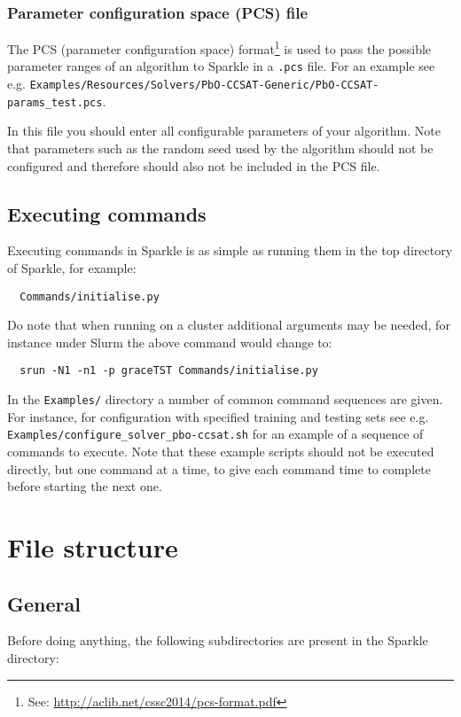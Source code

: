 \documentclass{article}
\begin{document}
\subsubsection{Parameter configuration space (PCS) file}
\label{quick:pcs_file}

The PCS (parameter configuration space) format\footnote{See: \url{http://aclib.net/cssc2014/pcs-format.pdf}} is used to pass the possible parameter ranges of an algorithm to Sparkle in a \texttt{.pcs} file. For an example see e.g. \texttt{Examples/Resources/Solvers/PbO-CCSAT-Generic/PbO-CCSAT-params\_test.pcs}.

In this file you should enter all configurable parameters of your algorithm. Note that parameters such as the random seed used by the algorithm should not be configured and therefore should also not be included in the PCS file.

\subsection{Executing commands}
\label{quick:execute_commands}

Executing commands in Sparkle is as simple as running them in the top directory of Sparkle, for example:

\begin{verbatim}
  Commands/initialise.py
\end{verbatim}

Do note that when running on a cluster additional arguments may be needed, for instance under Slurm the above command would change to:

\begin{verbatim}
  srun -N1 -n1 -p graceTST Commands/initialise.py
\end{verbatim}

In the \texttt{Examples/} directory a number of common command sequences are given. For instance, for configuration with specified training and testing sets see e.g. \texttt{Examples/configure\_solver\_pbo-ccsat.sh} for an example of a sequence of commands to execute. Note that these example scripts should not be executed directly, but one command at a time, to give each command time to complete before starting the next one.

\section{File structure}

\subsection{General}
Before doing anything, the following subdirectories are present in the Sparkle directory:
\end{document}
